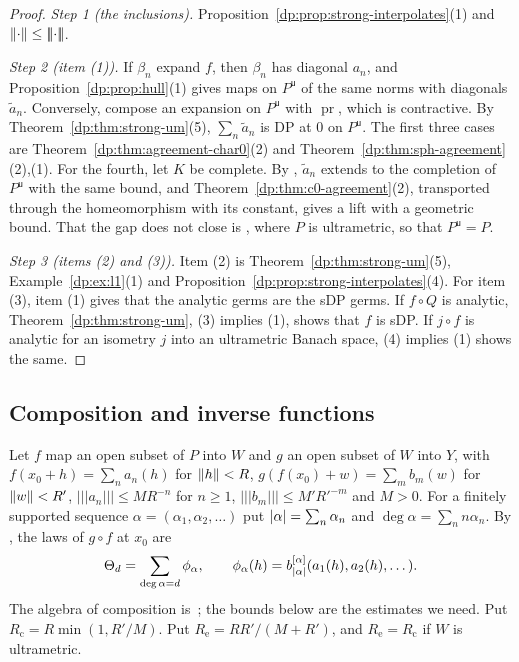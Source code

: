 \begin{proof}
\emph{Step 1 (the inclusions).} Proposition~\ref{dp:prop:strong-interpolates}(1) and $\lVert \cdot\rVert\le\lvert\!\lvert\!\lvert \cdot\rvert\!\rvert\!\rvert$.

\emph{Step 2 (item (1)).} If $\beta_n$ expand $f$, then $\beta_n$ has diagonal $a_n$, and Proposition~\ref{dp:prop:hull}(1) gives maps on $P^{\mathsf u}$ of the same norms with diagonals $\tilde a_n$. Conversely, compose an expansion on $P^{\mathsf u}$ with $\operatorname{pr}$, which is contractive. By Theorem~\ref{dp:thm:strong-um}(5), $\sum_n\tilde a_n$ is DP at $0$ on $P^{\mathsf u}$. The first three cases are Theorem~\ref{dp:thm:agreement-char0}(2) and Theorem~\ref{dp:thm:sph-agreement}(2),(1). For the fourth, let $K$ be complete. By \cite[Lemma~Q.13(1)]{I}, $\tilde a_n$ extends to the completion of $P^{\mathsf u}$ with the same bound, and Theorem~\ref{dp:thm:c0-agreement}(2), transported through the homeomorphism with its constant, gives a lift with a geometric bound. That the gap does not close is \cite[Proposition~14.40(3)]{I}, where $P$ is ultrametric, so that $P^{\mathsf u}=P$.

\emph{Step 3 (items (2) and (3)).} Item (2) is Theorem~\ref{dp:thm:strong-um}(5), Example~\ref{dp:ex:l1}(1) and Proposition~\ref{dp:prop:strong-interpolates}(4). For item (3), item (1) gives that the analytic germs are the sDP germs. If $f\circ Q$ is analytic, Theorem~\ref{dp:thm:strong-um}, (3) implies (1), shows that $f$ is sDP. If $j\circ f$ is analytic for an isometry $j$ into an ultrametric Banach space, (4) implies (1) shows the same.
\end{proof}

\subsection{Composition and inverse functions}\label{dp:s:ssec-composition}

Let $f$ map an open subset of $P$ into $W$ and $g$ an open subset of $W$ into $Y$, with $f(x_0+h)=\sum_na_n(h)$ for $\lVert h\rVert<R$, $g(f(x_0)+w)=\sum_mb_m(w)$ for $\lVert w\rVert<R'$, $\lvert\!\lvert\!\lvert a_n\rvert\!\rvert\!\rvert\le MR^{-n}$ for $n\ge1$, $\lvert\!\lvert\!\lvert b_m\rvert\!\rvert\!\rvert\le M'R'^{-m}$ and $M>0$. For a finitely supported sequence $\alpha=(\alpha_1,\alpha_2,\dots)$ put $\lvert \alpha\rvert=\sum_n\alpha_n$ and $\deg\alpha=\sum_nn\alpha_n$. By \cite[Lemma~Q.3]{I}, the laws of $g\circ f$ at $x_0$ are
\[
 \Theta_d=\sum_{\deg\alpha=d}\phi_\alpha,\qquad\phi_\alpha(h)=b_{\lvert \alpha\rvert}^{[\alpha]}(a_1(h),a_2(h),\dots).
\]
The algebra of composition is~\cite[VI~\S8, Prop.~VI.6, Cor.; Prop.~I.2; II~\S1]{Ro}; the bounds below are the estimates we need. Put $R_{\mathrm c}=R\min(1,R'/M)$. Put $R_{\mathrm e}=RR'/(M+R')$, and $R_{\mathrm e}=R_{\mathrm c}$ if $W$ is ultrametric.

